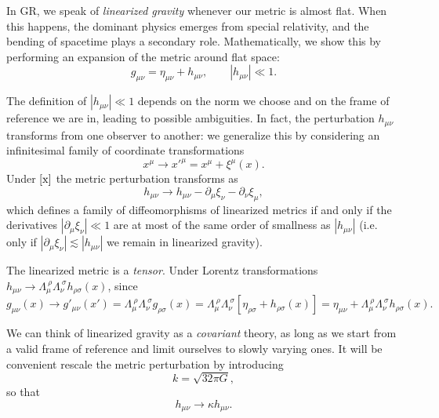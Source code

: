 \documentclass[12pt,a4paper,oneside]{article}
\numberwithin{equation}{section}   %
\begin{document}
In GR, we speak of \textit{linearized gravity} whenever our metric is almost flat. 
When this happens, the dominant physics emerges from special relativity, 
and the bending of spacetime plays a secondary role.
Mathematically, we show this by performing an expansion of the metric around flat space:
\begin{equation}
g_{\mu\nu} = \eta_{\mu\nu} + h_{\mu\nu}, \qquad |h_{\mu\nu}| \ll 1. \label{g}
\end{equation}

The definition of $|h_{\mu\nu}|\ll1$ depends on the norm we choose and on 
the frame of reference we are in, leading to possible ambiguities.
In fact, the perturbation $h_{\mu\nu}$ transforms from one observer to another:
we generalize this by considering an infinitesimal family of coordinate transformations
\begin{equation}
x^\mu \rightarrow x'^\mu = x^\mu + \xi^\mu(x). \label{x}
\end{equation}
Under $\eqref{x}$ the metric perturbation transforms as
\begin{equation}\label{gauge}
\boxed{h_{\mu\nu} \to h_{\mu\nu} - \partial_\mu \xi_\nu - \partial_\nu \xi_\mu},    
\end{equation}
which defines a family of diffeomorphisms 
of linearized metrics if and only if the derivatives 
$|\partial_\mu \xi_\nu| \ll 1$ are at most of the same order of 
smallness as $|h_{\mu\nu}|$ (i.e. only if $|\partial_\mu \xi_\nu| \lesssim |h_{\mu\nu}|$
we remain in linearized gravity).

The linearized metric is a \textit{tensor}. Under Lorentz transformations 
$h_{\mu\nu} \to \Lambda_{\mu}^{\ \rho}
\Lambda_{\nu}^{\ \sigma}
h_{\rho\sigma}(x)$, since
\begin{equation}
g_{\mu\nu}(x)
\rightarrow
g'_{\mu\nu}(x')
=
\Lambda_{\mu}^{\ \rho}
\Lambda_{\nu}^{\ \sigma}
g_{\rho\sigma}(x)
=
\Lambda_{\mu}^{\ \rho}
\Lambda_{\nu}^{\ \sigma}
\left[
\eta_{\rho\sigma}
+
h_{\rho\sigma}(x)
\right]
=
\eta_{\mu\nu}
+
\Lambda_{\mu}^{\ \rho}
\Lambda_{\nu}^{\ \sigma}
h_{\rho\sigma}(x).
\end{equation}

We can think of linearized gravity as a \textit{covariant} theory,
as long as we start from a valid frame of reference and
 limit ourselves to slowly varying ones. It will be
convenient rescale the metric perturbation by introducing
\begin{equation}k=\sqrt{32\pi G},\end{equation}
so that
\begin{equation}
    \boxed{
    h_{\mu\nu} \rightarrow \kappa h_{\mu\nu}}.
\end{equation}
\end{document}
